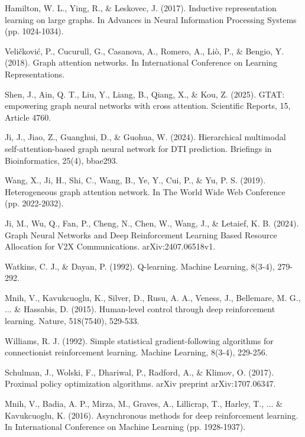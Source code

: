 \documentclass{article}
\begin{document}
\begin{thebibliography}{99}
 Hamilton, W. L., Ying, R., \& Leskovec, J. (2017). Inductive representation learning on large graphs. In Advances in Neural Information Processing Systems (pp. 1024-1034).

 Veličković, P., Cucurull, G., Casanova, A., Romero, A., Liò, P., \& Bengio, Y. (2018). Graph attention networks. In International Conference on Learning Representations.

 Shen, J., Ain, Q. T., Liu, Y., Liang, B., Qiang, X., \& Kou, Z. (2025). GTAT: empowering graph neural networks with cross attention. Scientific Reports, 15, Article 4760.

 Ji, J., Jiao, Z., Guanghui, D., \& Guohua, W. (2024). Hierarchical multimodal self-attention-based graph neural network for DTI prediction. Briefings in Bioinformatics, 25(4), bbae293.

 Wang, X., Ji, H., Shi, C., Wang, B., Ye, Y., Cui, P., \& Yu, P. S. (2019). Heterogeneous graph attention network. In The World Wide Web Conference (pp. 2022-2032).

 Ji, M., Wu, Q., Fan, P., Cheng, N., Chen, W., Wang, J., \& Letaief, K. B. (2024). Graph Neural Networks and Deep Reinforcement Learning Based Resource Allocation for V2X Communications. arXiv:2407.06518v1.

 Watkins, C. J., \& Dayan, P. (1992). Q-learning. Machine Learning, 8(3-4), 279-292.

 Mnih, V., Kavukcuoglu, K., Silver, D., Rusu, A. A., Veness, J., Bellemare, M. G., ... \& Hassabis, D. (2015). Human-level control through deep reinforcement learning. Nature, 518(7540), 529-533.

 Williams, R. J. (1992). Simple statistical gradient-following algorithms for connectionist reinforcement learning. Machine Learning, 8(3-4), 229-256.

 Schulman, J., Wolski, F., Dhariwal, P., Radford, A., \& Klimov, O. (2017). Proximal policy optimization algorithms. arXiv preprint arXiv:1707.06347.

 Mnih, V., Badia, A. P., Mirza, M., Graves, A., Lillicrap, T., Harley, T., ... \& Kavukcuoglu, K. (2016). Asynchronous methods for deep reinforcement learning. In International Conference on Machine Learning (pp. 1928-1937).


\end{thebibliography}
\end{document}
